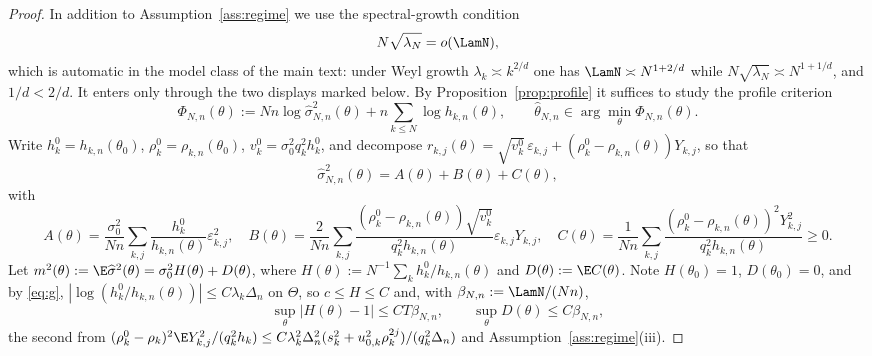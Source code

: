 \closuredraft
\begin{proof}
In addition to Assumption~\ref{ass:regime} we use the spectral-growth
condition
\begin{equation}\label{eq:cons-weyl}
 N\sqrt{\lambda_N}=o(\LamN),
\end{equation}
which is automatic in the model class of the main text: under Weyl growth
$\lambda_k\asymp k^{2/d}$ one has $\LamN\asymp N^{1+2/d}$ while
$N\sqrt{\lambda_N}\asymp N^{1+1/d}$, and $1/d<2/d$. It enters only through
the two displays marked below.
By Proposition~\ref{prop:profile} it suffices to study the profile criterion
\[
 \Phi_{N,n}(\theta)
 :=Nn\log\widehat\sigma^2_{N,n}(\theta)+n\sum_{k\le N}\log h_{k,n}(\theta),
 \qquad
 \widehat\theta_{N,n}\in\arg\min_\theta\Phi_{N,n}(\theta).
\]
Write $h_k^0=h_{k,n}(\theta_0)$, $\rho_k^0=\rho_{k,n}(\theta_0)$,
$v_k^0=\sigma_0^2q_k^2h_k^0$, and decompose
$r_{k,j}(\theta)=\sqrt{v_k^0}\,\varepsilon_{k,j}
+(\rho_k^0-\rho_{k,n}(\theta))Y_{k,j}$, so that
\begin{equation}\label{eq:cons-dec}
 \widehat\sigma^2_{N,n}(\theta)=A(\theta)+B(\theta)+C(\theta),
\end{equation}
with
\[
 A(\theta)=\frac{\sigma_0^2}{Nn}\sum_{k,j}\frac{h_k^0}{h_{k,n}(\theta)}
 \varepsilon_{k,j}^2,\quad
 B(\theta)=\frac{2}{Nn}\sum_{k,j}
 \frac{(\rho_k^0-\rho_{k,n}(\theta))\sqrt{v_k^0}}{q_k^2h_{k,n}(\theta)}
 \varepsilon_{k,j}Y_{k,j},\quad
 C(\theta)=\frac{1}{Nn}\sum_{k,j}
 \frac{(\rho_k^0-\rho_{k,n}(\theta))^2Y_{k,j}^2}{q_k^2h_{k,n}(\theta)}\ge0.
\]
Let $m^2(\theta):=\E\widehat\sigma^2(\theta)=\sigma_0^2H(\theta)+D(\theta)$,
where $H(\theta):=N^{-1}\sum_k h_k^0/h_{k,n}(\theta)$ and
$D(\theta):=\E C(\theta)$. Note $H(\theta_0)=1$, $D(\theta_0)=0$, and by
\eqref{eq:g}, $|\log(h_k^0/h_{k,n}(\theta))|\le C\lambda_k\Delta_n$ on
$\Theta$, so $c\le H\le C$ and, with $\beta_{N,n}:=\LamN/(Nn)$,
\begin{equation}\label{eq:cons-m-diff}
 \sup_\theta|H(\theta)-1|\le CT\beta_{N,n},
 \qquad
 \sup_\theta D(\theta)\le C\beta_{N,n},
\end{equation}
the second from
$(\rho^0_k-\rho_k)^2\E Y_{k,j}^2/(q_k^2h_k)\le
C\lambda_k^2\Delta_n^2(s_k^2+u_{0,k}^2\rho_k^{2j})/(q_k^2\Delta_n)$ and
Assumption~\ref{ass:regime}(iii).


\end{proof}
